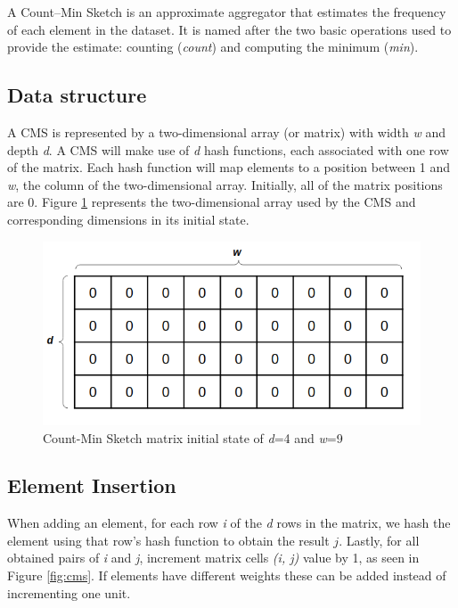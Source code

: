 A Count–Min Sketch \cite{Cormode-CMS} is an approximate aggregator that estimates the frequency of each element in the dataset. It is named after the two basic operations used to provide the estimate: counting (\textit{count}) and computing the minimum (\textit{min}).

\subsection*{Data structure}
A CMS is represented by a two-dimensional array (or matrix) with width \textit{w} and depth \textit{d}. A CMS will make use of \textit{d} hash functions, each associated with one row of the matrix. Each hash function will map elements to a position between 1 and \textit{w}, the column of the two-dimensional array. Initially, all of the matrix positions are 0. Figure \ref{fig:initial-cms} represents the two-dimensional array used by the CMS and corresponding dimensions in its initial state. 

\begin{figure}[!htb]
    \begin{center}
      \includegraphics[scale=0.5]{figures/initial-cms.png}
      \caption[Count-Min Sketch initial state]{Count-Min Sketch matrix initial state of \textit{d}=4 and \textit{w}=9}
      \label{fig:initial-cms}
    \end{center}
\end{figure}

\subsection*{Element Insertion}
When adding an element, for each row \textit{i} of the \textit{d} rows in the matrix, we hash the element using that row's hash function to obtain the result $j$. Lastly, for all obtained pairs of \textit{i} and \textit{j}, increment matrix cells \textit{(i, j)} value by 1, as seen in Figure \ref{fig:cms}. If elements have different weights these can be added instead of incrementing one unit.

